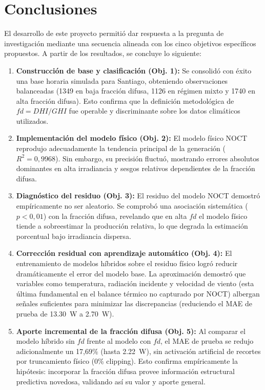 \documentclass[12pt, letterpaper]{article}
\begin{document}

\section{Conclusiones}

El desarrollo de este proyecto permiti\'o dar respuesta a la pregunta de investigaci\'on mediante una secuencia alineada con los cinco objetivos espec\'ificos propuestos. A partir de los resultados, se concluye lo siguiente:

\begin{enumerate}
    \item \textbf{Construcci\'on de base y clasificaci\'on (Obj. 1):} Se consolid\'o con \'exito una base horaria simulada para Santiago, obteniendo observaciones balanceadas (1349 en baja fracci\'on difusa, 1126 en r\'egimen mixto y 1740 en alta fracci\'on difusa). Esto confirma que la definici\'on metodol\'ogica de \(fd = DHI/GHI\) fue operable y discriminante sobre los datos clim\'aticos utilizados.
    \item \textbf{Implementaci\'on del modelo f\'isico (Obj. 2):} El modelo f\'isico NOCT reprodujo adecuadamente la tendencia principal de la generaci\'on (\(R^2 = 0{,}9968\)). Sin embargo, su precisi\'on fluctu\'o, mostrando errores absolutos dominantes en alta irradiancia y sesgos relativos dependientes de la fracci\'on difusa.
    \item \textbf{Diagn\'ostico del residuo (Obj. 3):} El residuo del modelo NOCT demostr\'o emp\'iricamente no ser aleatorio. Se comprob\'o una asociaci\'on sistem\'atica (\(p < 0{,}01\)) con la fracci\'on difusa, revelando que en alta \(fd\) el modelo f\'isico tiende a sobreestimar la producci\'on relativa, lo que degrada la estimaci\'on porcentual bajo irradiancia dispersa.
    \item \textbf{Correcci\'on residual con aprendizaje autom\'atico (Obj. 4):} El entrenamiento de modelos h\'ibridos sobre el residuo f\'isico logr\'o reducir dram\'aticamente el error del modelo base. La aproximaci\'on demostr\'o que variables como temperatura, radiaci\'on incidente y velocidad de viento (esta \'ultima fundamental en el balance t\'ermico no capturado por NOCT) albergan se\~nales suficientes para minimizar las discrepancias (reduciendo el MAE de prueba de \SI{13.30}{\watt} a \SI{2.70}{\watt}).
    \item \textbf{Aporte incremental de la fracci\'on difusa (Obj. 5):} Al comparar el modelo h\'ibrido sin \(fd\) frente al modelo con \(fd\), el MAE de prueba se redujo adicionalmente un 17,69\% (hasta \SI{2.22}{\watt}), sin activaci\'on artificial de recortes por truncamiento f\'isico (0\% clipping). Esto confirma emp\'iricamente la hip\'otesis: incorporar la fracci\'on difusa provee informaci\'on estructural predictiva novedosa, validando as\'i su valor y aporte general.
\end{enumerate}
\end{document}
